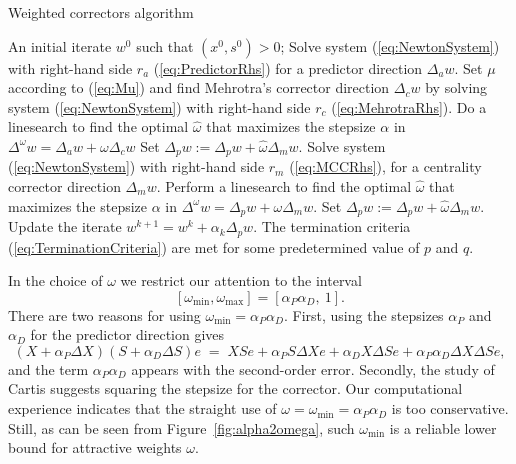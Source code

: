 \begin{algorithm}[ht]
  \caption{Weighted correctors algorithm}
    \begin{algorithmic}[0]  \label{alg:WeightedCorrectors}
      \REQUIRE An initial iterate $w^0$ such that $(x^0, s^0) > 0$;
      \smallskip
      \REPEAT
        \STATE Solve system (\ref{eq:NewtonSystem}) with right-hand side $r_a$
	       (\ref{eq:PredictorRhs}) for a predictor direction $\Delta_a w$.
        \smallskip
        \STATE Set $\mu$ according to (\ref{eq:Mu}) and find Mehrotra's
               corrector direction $\Delta_c w$ by solving system
               (\ref{eq:NewtonSystem}) with right-hand side $r_c$
               (\ref{eq:MehrotraRhs}).
        \smallskip
        \STATE Do a linesearch to find the optimal $\hat\omega$ that
               maximizes the stepsize $\alpha$ in
               $\Delta^\omega w = \Delta_a w +\omega\Delta_c w$
        \smallskip
	\STATE Set $\Delta_p w := \Delta_p w +\hat\omega\Delta_m w$. 
        \smallskip
           \smallskip
           \STATE Solve system (\ref{eq:NewtonSystem}) with right-hand side
                  $r_m$ (\ref{eq:MCCRhs}), for a centrality
                 corrector direction $\Delta_m w$.
           \smallskip
	   \STATE Perform a linesearch to find the optimal $\hat\omega$ that
                  maximizes the stepsize $\alpha$ in
                  $\Delta^\omega w = \Delta_p w +\omega\Delta_m w$.
           \smallskip
           \STATE Set $\Delta_p w := \Delta_p w +\hat\omega\Delta_m w$.
           \smallskip
        \ENDWHILE
        \STATE Update the iterate $w^{k+1} = w^k + \alpha_k\Delta_p w$.
        \smallskip
      \UNTIL The termination criteria (\ref{eq:TerminationCriteria}) are met
             for some predetermined value of $p$ and $q$.
  \end{algorithmic}
\end{algorithm}

In the choice of $\omega$ we restrict our attention to
the interval 
\[
  [\omega_{\min},\omega_{\max}]=[\alpha_P\alpha_D,\ 1]. 
\]
There are two reasons for using  $\omega_{\min} = \alpha_P\alpha_D$. 
First, using the stepsizes $\alpha_P$ and $\alpha_D$ for the predictor
direction gives 
\[
(X + \alpha_P \Delta X) (S + \alpha_D \Delta S) e 
\;=\; XSe + \alpha_P S\Delta Xe + \alpha_D X\Delta Se 
          + \alpha_P\alpha_D \Delta X\Delta S e,
\]
and the term $\alpha_P\alpha_D$ appears with the second-order error. 
Secondly, the study of Cartis \cite{Cartis04} suggests squaring 
the stepsize for the corrector. Our computational experience indicates 
that the straight use of $\omega = \omega_{\min} = \alpha_P\alpha_D$
is too conservative. 
Still, as can be seen from Figure~\ref{fig:alpha2omega},
such $\omega_{\min}$ is a reliable lower 
bound for attractive weights $\omega$. 

